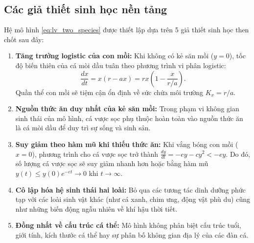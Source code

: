\subsection{Các giả thiết sinh học nền tảng}
Hệ mô hình \eqref{eq:lv_two_species} được thiết lập dựa trên 5 giả thiết sinh học then chốt sau đây:
\begin{enumerate}
    \item \textbf{Tăng trưởng logistic của con mồi:} Khi không có kẻ săn mồi ($y = 0$), tốc độ biến thiên của cá mòi dầu tuân theo phương trình vi phân logistic:
    \begin{equation}
    \frac{dx}{dt} = x(r - ax) = rx\left(1 - \frac{x}{r/a}\right).
    \end{equation}
    Quần thể con mồi sẽ tiệm cận ổn định về sức chứa môi trường $K_x = r/a$.
    
    \item \textbf{Nguồn thức ăn duy nhất của kẻ săn mồi:} Trong phạm vi không gian sinh thái của mô hình, cá vược sọc phụ thuộc hoàn toàn vào nguồn thức ăn là cá mòi dầu để duy trì sự sống và sinh sản.
    
    \item \textbf{Suy giảm theo hàm mũ khi thiếu thức ăn:} Khi vắng bóng con mồi ($x = 0$), phương trình cho cá vược sọc trở thành $\frac{dy}{dt} = -ey - cy^2 < -ey$. Do đó, số lượng cá vược sọc sẽ suy giảm nhanh hơn hoặc bằng hàm mũ $y(t) \le y(0)e^{-et} \to 0$ khi $t \to \infty$.
    
    \item \textbf{Cô lập hóa hệ sinh thái hai loài:} Bỏ qua các tương tác dinh dưỡng phức tạp với các loài sinh vật khác (như cá xanh, chim ưng, động vật phù du) cũng như những biến động ngẫu nhiên về khí hậu thời tiết.
    
    \item \textbf{Đồng nhất về cấu trúc cá thể:} Mô hình không phân biệt cấu trúc tuổi, giới tính, kích thước cá thể hay sự phân bố không gian địa lý của các đàn cá.
\end{enumerate}

